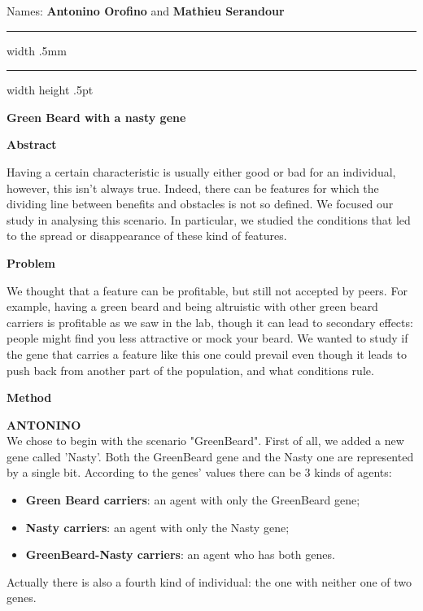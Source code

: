\documentclass[12pt,a4paper]{article}
\newcommand{\parag}[1]{
  \vspace{8mm}
  \noindent
  {\LARGE\textbf{#1}}
  \vspace{3mm}
}
\newcommand{\A}{\textbf{ANTONINO}\\}
\begin{document}
Names:	\textbf{Antonino Orofino} and \textbf{Mathieu Serandour}

\vspace{5mm}
\hrule width \hsize \kern .5mm \hrule width \hsize height .5pt
\vspace{4mm}

\begin{center}
{\LARGE\textbf{Green Beard with a nasty gene}}
\end{center}

\vspace{-4mm}
\parag{Abstract}

Having a certain characteristic is usually either good or bad for an individual, however, this isn't always true. Indeed, there can be features for which the dividing line between benefits and obstacles is not so defined.
We focused our study in analysing this scenario. In particular, we studied the conditions that led to the spread or disappearance of these kind of features.

\parag{Problem}

We thought that a feature can be profitable, but still not accepted by peers. For example, having a green beard and being altruistic with other green beard carriers is profitable as we saw in the lab, though it can lead to secondary effects: people might find you less attractive or mock your beard. We wanted to study if the gene that carries a feature like this one could prevail even though it leads to push back from another part of the population, and what conditions rule.

\parag{Method}

\A
We chose to begin with the scenario "GreenBeard". First of all, we added a new gene called 'Nasty'. Both the GreenBeard gene and the Nasty one are represented by a single bit. According to the genes' values there can be 3 kinds of agents:
\begin{itemize}
  \setlength\itemsep{0.5mm}
  \item \textbf{Green Beard carriers}: an agent with only the GreenBeard gene;
  \item \textbf{Nasty carriers}: an agent with only the Nasty gene;
  \item \textbf{GreenBeard-Nasty carriers}: an agent who has both genes.
\end{itemize}
Actually there is also a fourth kind of individual: the one with neither one of two genes.
\end{document}
